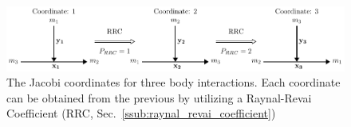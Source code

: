 \begin{figure}[t]
\centering
\includegraphics[width=\linewidth]{figs/Two_electron/coord_1.pdf}
\caption{The Jacobi coordinates for three body interactions. Each coordinate can be obtained from the previous by utilizing a Raynal-Revai Coefficient (RRC, Sec.~\ref{ssub:raynal_revai_coefficient})} 
  \label{fig:jacobi_coord}
\end{figure}




